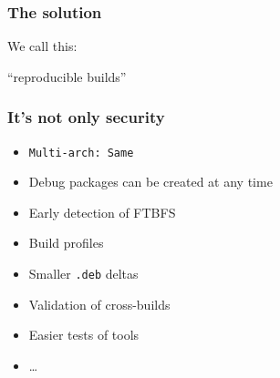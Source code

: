 \documentclass[14pt,aspectratio=169]{beamer}
\begin{document}
\begin{frame}
 \frametitle{The solution}

 \begin{center}
 We call this:

 \Huge
 “reproducible builds”
 \end{center}
\end{frame}

\begin{frame}
 \frametitle{It's not only security}

 \begin{itemize}
  \item \texttt{Multi-arch: Same}
  \item Debug packages can be created at any time
  \item Early detection of FTBFS
  \item Build profiles
  \item Smaller \texttt{.deb} deltas
  \item Validation of cross-builds
  \item Easier tests of tools
  \item …
 \end{itemize}
\end{frame}

\begin{frame}[plain]
\end{frame}
\end{document}
